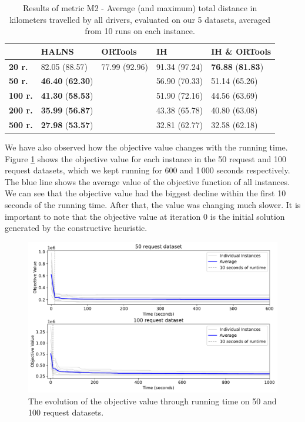     
    \begin{table}[!ht]
    \centering
    {\renewcommand{\arraystretch}{1.5}
    \begin{tabular}{lllll}
    \hline
                    & \textbf{HALNS}    & \textbf{ORTools}  & \textbf{IH}         & \textbf{IH \& ORTools} \\ \hline
    \textbf{20 r.}  & 82.05 (88.57)     & 77.99 (92.96)     & 91.34 (97.24)       & \textbf{76.88} (\textbf{81.83})          \\
    \textbf{50 r.}  & \textbf{46.40} (\textbf{62.30})     &                   & 56.90 (70.33)       & 51.14 (65.26)          \\
    \textbf{100 r.} & \textbf{41.30} (\textbf{58.53})     &                   & 51.90 (72.16)       & 44.56 (63.69)          \\
    \textbf{200 r.} & \textbf{35.99} (\textbf{56.87})     &                   & 43.38 (65.78)       & 40.80 (63.08)          \\
    \textbf{500 r.} & \textbf{27.98} (\textbf{53.57})     &                   & 32.81 (62.77)       & 32.58 (62.18)
    \end{tabular}}
    \caption{Results of metric M2 - Average (and maximum) total distance in kilometers travelled by all drivers, evaluated on our 5 datasets, averaged from 10 runs on each instance.}
    \label{tab:distance}
    \end{table}
    
    We have also observed how the objective value changes with the running time. Figure \ref{fig:graph-times} shows the objective value for each instance in the 50 request and 100 request datasets, which we kept running for 600 and 1\,000 seconds respectively. The blue line shows the average value of the objective function of all instances. We can see that the objective value had the biggest decline within the first 10 seconds of the running time. After that, the value was changing much slower. It is important to note that the objective value at iteration 0 is the initial solution generated by the constructive heuristic.
    
    
    \begin{figure}[!ht]
        \centering
        \includegraphics[width=\textwidth]{figures/graph-times.pdf}
        \caption{The evolution of the objective value through running time on 50 and 100 request datasets.}
        \label{fig:graph-times}
    \end{figure}

